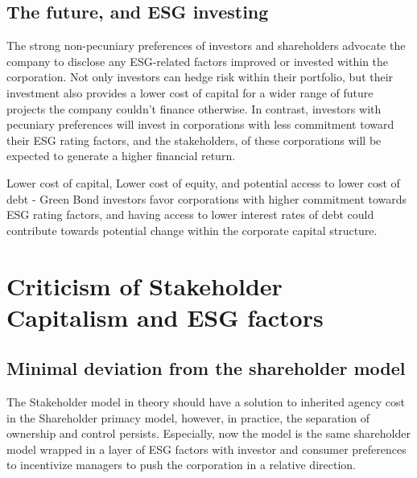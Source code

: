 \documentclass[a4paper, 12pt]{article}
\begin{document}
\vspace{-10pt}
\subsection{The future, and ESG investing}
\vspace{-10pt}
  \hspace{12pt} The strong non-pecuniary preferences of investors and shareholders advocate the company to disclose any ESG-related factors improved or invested within the corporation. Not only investors can hedge risk within their portfolio, but their investment also provides a lower cost of capital for a wider range of future projects the company couldn't finance otherwise. In contrast, investors with pecuniary preferences will invest in corporations with less commitment toward their ESG rating factors, and the stakeholders, of these corporations will be expected to generate a higher financial return. 

  Lower cost of capital, Lower cost of equity, and potential access to lower cost of debt - Green Bond investors favor corporations with higher commitment towards ESG rating factors, and having access to lower interest rates of debt could contribute towards potential change within the corporate capital structure. 


\section{Criticism of Stakeholder Capitalism and ESG factors} \label{Criticism}
\vspace{-10pt}
\subsection{Minimal deviation from the shareholder model}\label{nonpecuniary preferences}
\vspace{-10pt}

  \hspace{12pt} The Stakeholder model in theory should have a solution to inherited agency cost in the Shareholder primacy model, however, in practice, the separation of ownership and control persists. Especially, now the model is the same shareholder model wrapped in a layer of ESG factors with investor and consumer preferences to incentivize managers to push the corporation in a relative direction. 
  
\end{document}
